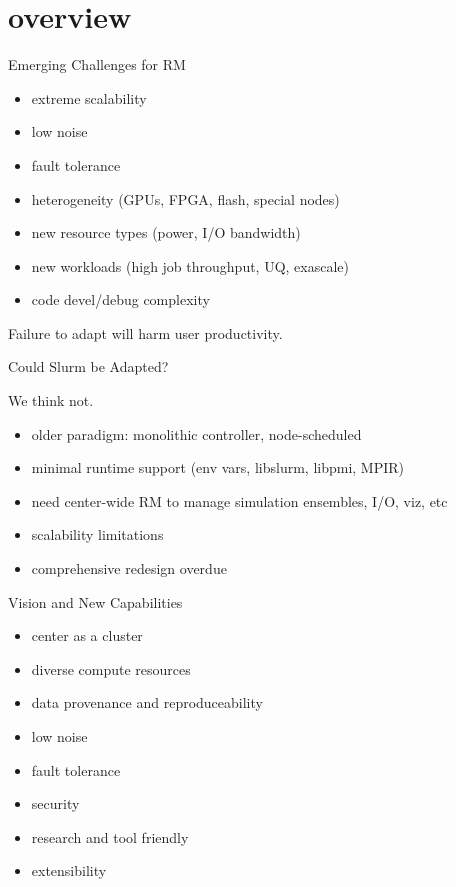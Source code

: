 \documentclass[default,pdf,colorBG,slideColor]{prosper}
\begin{document}
\part{overview}
\begin{slide}{Emerging Challenges for RM}{\small
\begin{itemize}
  \item{extreme scalability}
  \item{low noise}
  \item{fault tolerance}
  \item{heterogeneity (GPUs, FPGA, flash, special nodes)}
  \item{new resource types (power, I/O bandwidth)}
  \item{new workloads (high job throughput, UQ, exascale)}
  \item{code devel/debug complexity}
\end{itemize}
Failure to adapt will harm user productivity.
}\end{slide}
\begin{slide}{Could Slurm be Adapted?}{\small
We think not.
\begin{itemize}
  \item{older paradigm: monolithic controller, node-scheduled}
  \item{minimal runtime support (env vars, libslurm, libpmi, MPIR)}
  \item{need center-wide RM to manage simulation ensembles, I/O, viz, etc}
  \item{scalability limitations}
  \item{comprehensive redesign overdue}
\end{itemize}
}\end{slide}
\begin{slide}{Vision and New Capabilities}{\small
\begin{itemize}
  \item{center as a cluster}
  \item{diverse compute resources}
  \item{data provenance and reproduceability}
  \item{low noise}
  \item{fault tolerance}
  \item{security}
  \item{research and tool friendly}
  \item{extensibility}
\end{itemize}
}\end{slide}
\end{document}
